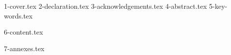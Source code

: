 \documentclass[12pt,a4paper,oneside]{book}
\begin{document}
{1-cover.tex}
{2-declaration.tex}
{3-acknowledgements.tex}
{4-abstract.tex}
{5-key-words.tex}
\tableofcontents


{6-content.tex}





{7-annexes.tex}
\end{document}
